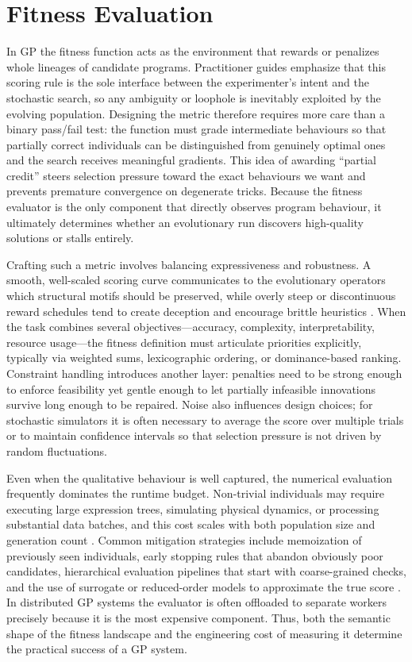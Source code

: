 \documentclass[12pt,a4paper]{report}
\begin{document}
\section{Fitness Evaluation}
\label{sec:fitness-evaluation}
\par In GP the fitness function acts as the environment that rewards or penalizes whole lineages of candidate programs. Practitioner guides emphasize that this scoring rule is the sole interface between the experimenter’s intent and the stochastic search, so any ambiguity or loophole is inevitably exploited by the evolving population. Designing the metric therefore requires more care than a binary pass/fail test: the function must grade intermediate behaviours so that partially correct individuals can be distinguished from genuinely optimal ones and the search receives meaningful gradients. This idea of awarding “partial credit” steers selection pressure toward the exact behaviours we want and prevents premature convergence on degenerate tricks. Because the fitness evaluator is the only component that directly observes program behaviour, it ultimately determines whether an evolutionary run discovers high-quality solutions or stalls entirely.

\par Crafting such a metric involves balancing expressiveness and robustness. A smooth, well-scaled scoring curve communicates to the evolutionary operators which structural motifs should be preserved, while overly steep or discontinuous reward schedules tend to create deception and encourage brittle heuristics \cite{luke2016}. When the task combines several objectives—accuracy, complexity, interpretability, resource usage—the fitness definition must articulate priorities explicitly, typically via weighted sums, lexicographic ordering, or dominance-based ranking. Constraint handling introduces another layer: penalties need to be strong enough to enforce feasibility yet gentle enough to let partially infeasible innovations survive long enough to be repaired. Noise also influences design choices; for stochastic simulators it is often necessary to average the score over multiple trials or to maintain confidence intervals so that selection pressure is not driven by random fluctuations.

\par Even when the qualitative behaviour is well captured, the numerical evaluation frequently dominates the runtime budget. Non-trivial individuals may require executing large expression trees, simulating physical dynamics, or processing substantial data batches, and this cost scales with both population size and generation count \cite{luke2016}. Common mitigation strategies include memoization of previously seen individuals, early stopping rules that abandon obviously poor candidates, hierarchical evaluation pipelines that start with coarse-grained checks, and the use of surrogate or reduced-order models to approximate the true score \cite{tong2019}. In distributed GP systems the evaluator is often offloaded to separate workers precisely because it is the most expensive component. Thus, both the semantic shape of the fitness landscape and the engineering cost of measuring it determine the practical success of a GP system.
\end{document}
